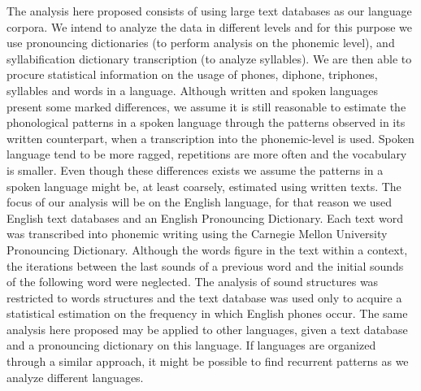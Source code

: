The analysis here proposed consists of using large text databases 
as our language corpora. We intend to analyze the data in different levels
and for this purpose we use pronouncing dictionaries (to perform analysis on the phonemic level),
and syllabification dictionary transcription (to analyze syllables).
We are then able to procure statistical information on the usage of phones,
diphone, triphones, syllables and words in a language.
Although written and spoken languages present some marked differences, we assume 
it is still reasonable
to estimate the phonological patterns in a spoken language through  %
the patterns observed in its written counterpart, when a transcription into the phonemic-level is used.
Spoken language tend to be more ragged, repetitions are more often and the vocabulary
is smaller. Even though these differences exists
we assume the patterns in a spoken language might be, at least coarsely, estimated using written texts.
The focus of our analysis will be on the English language, for that reason we used English text databases
and an English Pronouncing Dictionary. Each text word was transcribed into phonemic 
writing using the Carnegie Mellon University Pronouncing Dictionary. 
Although the words figure in the text within a context, the iterations between the last sounds of a previous word 
and the initial sounds of the following word were neglected.
The analysis of sound structures was restricted to words structures and the text database was used only 
to acquire a statistical estimation on the frequency in which English phones occur.  
The same analysis here proposed may be applied to other languages, 
given a text database and a pronouncing dictionary on this language.
If languages are organized through a similar approach, it might be possible to find recurrent patterns 
as we analyze different languages. 


